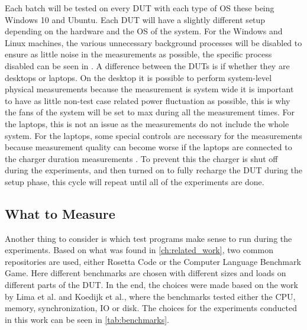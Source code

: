 Each batch will be tested on every DUT with each type of OS these being Windows 10 and Ubuntu. Each DUT will have a slightly different setup depending on the hardware and the OS of the system. For the Windows and Linux machines, the various unnecessary background processes will be disabled to ensure as little noise in the measurements as possible\cite*[]{sestoft2013microbenchmarks}, the specific process disabled can be seen in . A difference between the DUTs is if whether they are desktops or laptops. On the desktop it is possible to perform system-level physical measurements because the measurement is system wide it is important to have as little non-test case related power fluctuation as possible, this is why the fans of the system will be set to max during all the measurement times. For the laptops, this is not an issue as the measurements do not include the whole system. For the laptops, some special controls are necessary for the measurements because measurement quality can become worse if the laptops are connected to the charger duration measurements \cite{E3Video}. To prevent this the charger is shut off during the experiments, and then turned on to fully recharge the DUT during the setup phase, this cycle will repeat until all of the experiments are done.

\subsection{What to Measure}

Another thing to consider is which test programs make sense to run during the experiments. Based on what was found in \cref*{ch:related_work}, two common repositories are used, either Rosetta Code\cite*[]{rosetta_code} or the Computer Language Benchmark Game\cite*[]{benchmark_game}. Here different benchmarks are chosen with different sizes and loads on different parts of the DUT. In the end, the choices were made based on the work by Lima et al.\cite*[]{greenland2016statistical} and Koedijk et al.\cite*[]{Koedijk2022diff}, where the benchmarks tested either the CPU, memory, synchronization, IO or disk. The choices for the experiments conducted in this work can be seen in \cref*{tab:benchmarks}.




